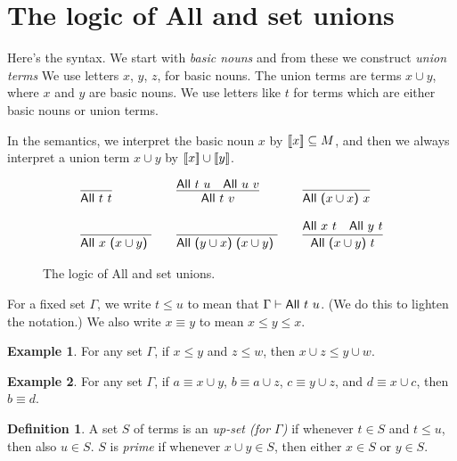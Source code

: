 \documentclass[12pt]{article}
\theoremstyle{definition}
\newtheorem{definition}{Definition}
\newtheorem{example}{Example}
\newcommand{\semantics}[1]{[\![\mbox{\em $ #1 $\/}]\!]}
\newcommand{\proves}{\vdash}
\newlength{\mathfrwidth}
\newenvironment{mathframe}
    {\begin{lrbox}{\mathfrbox}\begin{minipage}{\mathfrwidth}\begin{center}}
    {\end{center}\end{minipage}\end{lrbox}\noindent\fbox{\usebox{\mathfrbox}}}
\begin{document}


\section{The logic of {\sf All} and set unions}

Here's the syntax.   We start with \emph{basic nouns} and from these we construct \emph{union terms}
We
use letters $x$, $y$, $z$, for basic nouns.  The union terms are terms $x\cup y$, where $x$ and $y$ are basic nouns.
We use letters like $t$ for terms which are either basic nouns  or union terms.

In the semantics, we interpret the basic noun $x$ by $\semantics{x}\subseteq M$, and then we always interpret a union term $x\cup y$ by 
$\semantics{x}\cup\semantics{y}$.

\begin{figure}[t]
\begin{mathframe}
\[
\begin{array}{l@{\qquad}l@{\qquad}l}
\infer{\mbox{\sf All $t$ $t$}}{}
&
\infer{\mbox{\sf All $t$ $v$}}{\mbox{\sf All $t$ $u$} & \mbox{\sf All $u$ $v$}}
&
\infer{\mbox{\sf All ($x\cup x$) $x$}}{}  \\  \\
\infer{\mbox{\sf All $x$ ($x\cup y$) }}{} &
\infer{\mbox{\sf All ($y \cup x$) ($x\cup y$) }}{} &
\infer{\mbox{\sf All ($x\cup y$) $t$}}{\mbox{\sf All $x$ $t$} & \mbox{\sf All $y$ $t$}}
\end{array}
\]
\caption{The logic of {\sf All} and set unions.\label{fig-all-unions}}
\end{mathframe}
\end{figure}

For a fixed set $\Gamma$, we write $t\leq u$ to mean that $\Gamma\proves \mbox{\sf All $t$ $u$}$.
(We do this to lighten the notation.)    We also write $x \equiv y$ to mean $x\leq y \leq x$.

\begin{example}
For any set $\Gamma$, if $x\leq y$ and $z\leq w$, then $x\cup z \leq y\cup w$.
\label{ex-1}
\end{example}

\begin{example}
For any set $\Gamma$, if $a\equiv x\cup y$, $b\equiv a\cup z$, 
$c \equiv y \cup z$, and $d \equiv x \cup c$, then $b \equiv d$.
\label{ex-2}
\end{example}

\begin{definition} 
A set $S$ of terms is an \emph{up-set (for $\Gamma$)} if whenever $t\in S$ and $t\leq u$, then also $u\in S$.
$S$ is \emph{prime} if whenever $x\cup y \in S$, then either $x\in S$ or $y\in S$.
\end{definition}
\end{document}
